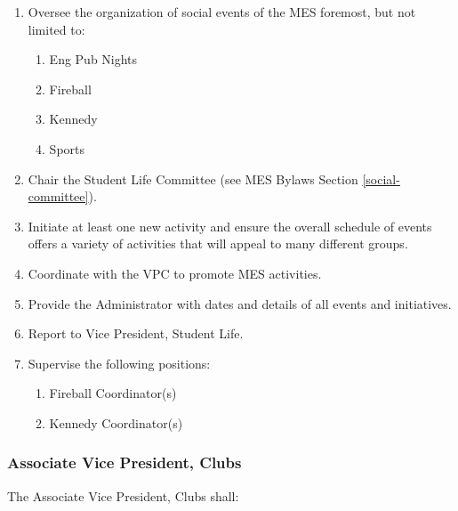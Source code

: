 \begin{enumerate}
 \item
  Oversee the organization of social events of the MES foremost, but not limited to:

  \begin{enumerate}
   \item
    Eng Pub Nights
   \item
    Fireball
   \item
    Kennedy
   \item
    Sports
  \end{enumerate}
 \item
  Chair the Student Life Committee (see MES Bylaws Section \ref{social-committee}).
 \item
  Initiate at least one new activity and ensure the overall schedule of events offers a variety of activities that will appeal to many different groups.
 \item
  Coordinate with the VPC to promote MES activities.
 \item
  Provide the Administrator with dates and details of all events and initiatives.
 \item
  Report to Vice President, Student Life.
 \item
  Supervise the following positions:

  \begin{enumerate}
   \item
    Fireball Coordinator(s)
   \item
    Kennedy Coordinator(s)

  \end{enumerate}
\end{enumerate}

\subsubsection{Associate Vice President, Clubs}
\label{associate-vice-president-clubs}
The Associate Vice President, Clubs shall:

